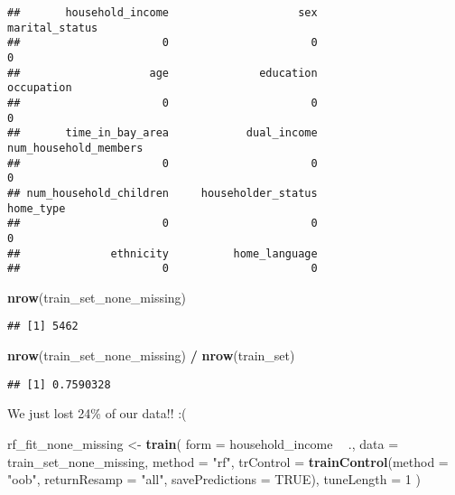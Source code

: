 \documentclass[]{article}
\newenvironment{Shaded}{\begin{snugshade}}{\end{snugshade}}
\newcommand{\KeywordTok}[1]{\textcolor[rgb]{0.13,0.29,0.53}{\textbf{#1}}}
\newcommand{\DataTypeTok}[1]{\textcolor[rgb]{0.13,0.29,0.53}{#1}}
\newcommand{\DecValTok}[1]{\textcolor[rgb]{0.00,0.00,0.81}{#1}}
\newcommand{\StringTok}[1]{\textcolor[rgb]{0.31,0.60,0.02}{#1}}
\newcommand{\OtherTok}[1]{\textcolor[rgb]{0.56,0.35,0.01}{#1}}
\newcommand{\OperatorTok}[1]{\textcolor[rgb]{0.81,0.36,0.00}{\textbf{#1}}}
\newcommand{\NormalTok}[1]{#1}
\begin{document}
\begin{Shaded}
\end{Shaded}

\begin{verbatim}
##       household_income                    sex         marital_status 
##                      0                      0                      0 
##                    age              education             occupation 
##                      0                      0                      0 
##       time_in_bay_area            dual_income  num_household_members 
##                      0                      0                      0 
## num_household_children     householder_status              home_type 
##                      0                      0                      0 
##              ethnicity          home_language 
##                      0                      0
\end{verbatim}

\begin{Shaded}
\begin{Highlighting}[]
\KeywordTok{nrow}\NormalTok{(train_set_none_missing)}
\end{Highlighting}
\end{Shaded}

\begin{verbatim}
## [1] 5462
\end{verbatim}

\begin{Shaded}
\begin{Highlighting}[]
\KeywordTok{nrow}\NormalTok{(train_set_none_missing) }\OperatorTok{/}\StringTok{ }\KeywordTok{nrow}\NormalTok{(train_set)}
\end{Highlighting}
\end{Shaded}

\begin{verbatim}
## [1] 0.7590328
\end{verbatim}

We just lost 24\% of our data!! :(

\begin{Shaded}
\begin{Highlighting}[]
\NormalTok{rf_fit_none_missing <-}\StringTok{ }\KeywordTok{train}\NormalTok{(}
  \DataTypeTok{form =}\NormalTok{ household_income }\OperatorTok{~}\StringTok{ }\NormalTok{.,}
  \DataTypeTok{data =}\NormalTok{ train_set_none_missing,}
  \DataTypeTok{method =} \StringTok{"rf"}\NormalTok{,}
  \DataTypeTok{trControl =} \KeywordTok{trainControl}\NormalTok{(}\DataTypeTok{method =} \StringTok{"oob"}\NormalTok{,}
    \DataTypeTok{returnResamp =} \StringTok{"all"}\NormalTok{,}
    \DataTypeTok{savePredictions =} \OtherTok{TRUE}\NormalTok{),}
  \DataTypeTok{tuneLength =} \DecValTok{1}
\NormalTok{)}
\end{Highlighting}
\end{Shaded}
\end{document}
